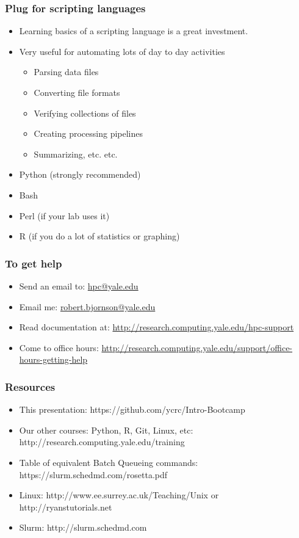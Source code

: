 \documentclass[10pt]{beamer}
\begin{document}
\begin{frame}[fragile]
\frametitle{Plug for scripting languages}

\begin{itemize}
\item Learning basics of a scripting language is a great investment.
\item Very useful for automating lots of day to day activities
\begin{itemize}
\item Parsing data files
\item Converting file formats
\item Verifying collections of files
\item Creating processing pipelines
\item Summarizing, etc. etc.
\end{itemize}
\item Python (strongly recommended)
\item Bash 
\item Perl (if your lab uses it)
\item R (if you do a lot of statistics or graphing)
\end{itemize}

\end{frame}

\begin{frame}
\frametitle{To get help}
\begin{itemize}
\item Send an email to: \url{hpc@yale.edu}
\item Email me: \url{robert.bjornson@yale.edu}
\item Read documentation at: \url{http://research.computing.yale.edu/hpc-support}
\item Come to office hours: \url{http://research.computing.yale.edu/support/office-hours-getting-help}
\end{itemize}
\end{frame}

\begin{frame}[fragile]
\frametitle{Resources}

\begin{itemize}
\item This presentation: https://github.com/ycrc/Intro-Bootcamp
\item Our other courses: Python, R, Git, Linux, etc: http://research.computing.yale.edu/training
\item Table of equivalent Batch Queueing commands: https://slurm.schedmd.com/rosetta.pdf
\item Linux: http://www.ee.surrey.ac.uk/Teaching/Unix or http://ryanstutorials.net
\item Slurm: http://slurm.schedmd.com
\end{itemize}

\end{frame}
\end{document}
